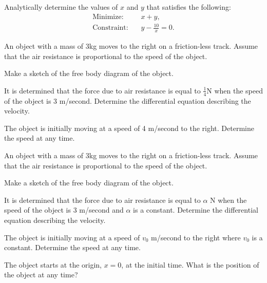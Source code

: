 \begin{problem}
\item Analytically determine the values of $x$ and $y$ that satisfies
  the following:
    \begin{eqnarray*}
      \mathrm{Minimize:} && x+y, \\
      \mathrm{Constraint:} && y - \frac{10}{x}  =  0.
    \end{eqnarray*}
    \vfill

  \clearpage

\item An object with a mass of 3kg moves to the right on a
  friction-less track. Assume that the air resistance is proportional
  to the speed of the object.
  \begin{subproblem}
  \item Make a sketch of the free body diagram of the object.
    \vfill
  \item It is determined that the force due to air resistance is equal
    to $\frac{1}{4}$N when the speed of the object is 3
    m/second. Determine the differential equation describing the velocity.
    \vfill
  \item The object is initially moving at a speed of 4 m/second to the
    right. Determine the speed at any time.
    \vfill
    \vfill
  \end{subproblem}

  \clearpage

\item An object with a mass of 3kg moves to the right on a
  friction-less track. Assume that the air resistance is proportional
  to the speed of the object.
  \label{problem:generalAirResistance}
  \begin{subproblem}
  \item Make a sketch of the free body diagram of the object.

    \vfill

  \item It is determined that the force due to air resistance is equal
    to $\alpha$ N when the speed of the object is 3 m/second and
    $\alpha$ is a constant. Determine the differential equation
    describing the velocity.

    \vfill
    \vfill

    \clearpage

  \item The object is initially moving at a speed of $v_0$ m/second to
    the right where $v_0$ is a constant. Determine the speed at any
    time.

    \vfill

  \item The object starts at the origin, $x=0$, at the initial
    time. What is the position of the object at any time?

    \vfill

  \end{subproblem}

\end{problem}

